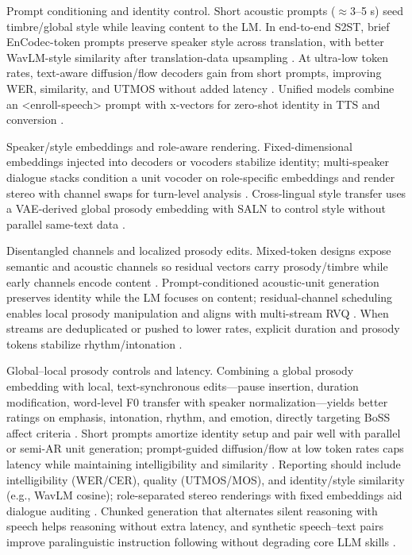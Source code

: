 \documentclass{article}
\begin{document}
Prompt conditioning and identity control. Short acoustic prompts ($\approx$3--5 s) seed timbre/global style while leaving content to the LM. In end-to-end S2ST, brief EnCodec-token prompts preserve speaker style across translation, with better WavLM-style similarity after translation-data upsampling \cite{peng2024mslms2stmultitaskspeechlanguagemodeltext}. At ultra-low token rates, text-aware diffusion/flow decoders gain from short prompts, improving WER, similarity, and UTMOS without added latency \cite{wang2025tadicodectextawarediffusionspeechtokeniz}. Unified models combine an <enroll-speech> prompt with x-vectors for zero-shot identity in TTS and conversion \cite{wu2024speechcomposerunifyingmultiplespeechtask}.

Speaker/style embeddings and role-aware rendering. Fixed-dimensional embeddings injected into decoders or vocoders stabilize identity; multi-speaker dialogue stacks condition a unit vocoder on role-specific embeddings and render stereo with channel swaps for turn-level analysis \cite{nakata2024jchatjapaneselargescalespokendialoguecor}. Cross-lingual style transfer uses a VAE-derived global prosody embedding with SALN to control style without parallel same-text data \cite{huang2023holisticcascadesystembenchmarkhumanevalu}.

Disentangled channels and localized prosody edits. Mixed-token designs expose semantic and acoustic channels so residual vectors carry prosody/timbre while early channels encode content \cite{wang2025bossbeyondsemanticspeech}. Prompt-conditioned acoustic-unit generation preserves identity while the LM focuses on content; residual-channel scheduling enables local prosody manipulation and aligns with multi-stream RVQ \cite{peng2024mslms2stmultitaskspeechlanguagemodeltext}. When streams are deduplicated or pushed to lower rates, explicit duration and prosody tokens stabilize rhythm/intonation \cite{huang2023holisticcascadesystembenchmarkhumanevalu}.

Global--local prosody controls and latency. Combining a global prosody embedding with local, text-synchronous edits---pause insertion, duration modification, word-level F0 transfer with speaker normalization---yields better ratings on emphasis, intonation, rhythm, and emotion, directly targeting BoSS affect criteria \cite{huang2023holisticcascadesystembenchmarkhumanevalu,wang2025bossbeyondsemanticspeech}. Short prompts amortize identity setup and pair well with parallel or semi-AR unit generation; prompt-guided diffusion/flow at low token rates caps latency while maintaining intelligibility and similarity \cite{wang2025tadicodectextawarediffusionspeechtokeniz}. Reporting should include intelligibility (WER/CER), quality (UTMOS/MOS), and identity/style similarity (e.g., WavLM cosine); role-separated stereo renderings with fixed embeddings aid dialogue auditing \cite{nakata2024jchatjapaneselargescalespokendialoguecor}. Chunked generation that alternates silent reasoning with speech helps reasoning without extra latency, and synthetic speech--text pairs improve paralinguistic instruction following without degrading core LLM skills \cite{chiang2025stitchsimultaneousthinkingtalkingchunked,lu2025desta2developinginstructionfollowingspee}.
\end{document}
